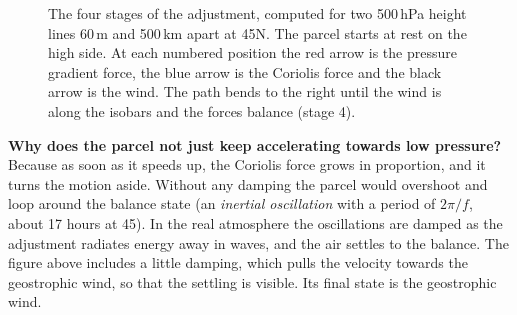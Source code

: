 \begin{figure}[ht]
\centering
{}
\caption{The four stages of the adjustment, computed for two 500\,hPa height lines 60\,m and 500\,km apart at 45\deg N. The parcel starts at rest on the high side. At each numbered position the red arrow is the pressure gradient force, the blue arrow is the Coriolis force and the black arrow is the wind. The path bends to the right until the wind is along the isobars and the forces balance (stage 4).}\label{p3-fig:adjN}
\end{figure}

\begin{askbox}
\textbf{Why does the parcel not just keep accelerating towards low pressure?}\\
Because as soon as it speeds up, the Coriolis force grows in proportion, and it turns the motion aside. Without any damping the parcel would overshoot and loop around the balance state (an \emph{inertial oscillation} with a period of $2\pi/f$, about 17 hours at 45\deg). In the real atmosphere the oscillations are damped as the adjustment radiates energy away in waves, and the air settles to the balance. The figure above includes a little damping, which pulls the velocity towards the geostrophic wind, so that the settling is visible. Its final state is the geostrophic wind.
\end{askbox}

